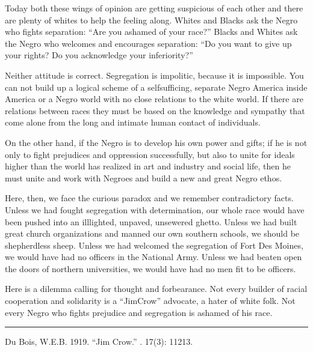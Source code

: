 \documentclass[letterpaper,10pt,english]{jupyterBook}
\begin{document}
\sphinxAtStartPar
Today both these wings of opinion are getting suspicious of each other and there are plenty of whites to help the feeling along. Whites and Blacks ask the Negro who fights separation: “Are you ashamed of your race?” Blacks and Whites ask the Negro who welcomes and encourages separation: “Do you want to give up your rights? Do you acknowledge your inferi­ority?”

\sphinxAtStartPar
Neither attitude is correct. Segregation is impolitic, because it is impossible. You can not build up a logical scheme of a self\sphinxhyphen{}sufficing, sep­arate Negro America inside America or a Negro world with no close rela­tions to the white world. If there are relations between races they must be based on the knowledge and sym­pathy that come alone from the long and intimate human contact of indi­viduals.

\sphinxAtStartPar
On the other hand, if the Negro is to develop his own power and gifts; if he is not only to fight prejudices and oppression successfully, but also to unite for ideals higher than the world has realized in art and indus­try and social life, then he must unite and work with Negroes and build a new and great Negro ethos.

\sphinxAtStartPar
Here, then, we face the curious paradox and we remember contradictory facts. Unless we had fought segregation with determination, our whole race would have been pushed into an ill\sphinxhyphen{}lighted, unpaved, un\sphinxhyphen{}sewered ghetto. Unless we had built great church organizations and manned our own southern schools, we should be shepherdless sheep. Unless we had welcomed the segregation of Fort Des Moines, we would have had no officers in the National Army. Unless we had beaten open the doors of northern universities, we would have had no men fit to be officers.

\sphinxAtStartPar
Here is a dilemma calling for thought and forbearance. Not every builder of racial co\sphinxhyphen{}operation and solidarity is a “Jim\sphinxhyphen{}Crow” advocate, a hater of white folk. Not every Negro who fights prejudice and segregation is ashamed of his race.


\bigskip\hrule\bigskip


\sphinxAtStartPar
{} Du Bois, W.E.B. 1919. “Jim Crow.” . 17(3): 112\sphinxhyphen{}13.
\end{document}
